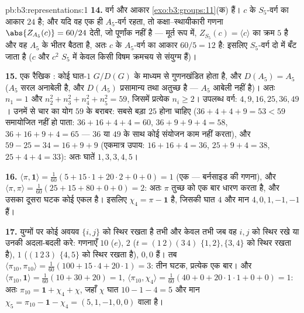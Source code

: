 \begin{solution}{pb:b3:representations:1}
\textbf{14.} वर्ग और आकार \cref{exo:b3:groups:11}(क) हैं। $c$ के $S_5$-वर्ग का आकार
$24$ है; और यदि वह एक ही $A_5$-वर्ग रहता, तो कक्षा--स्थायीकारी गणना
$\abs{Z_{A_5}(c)} = 60/24$ देती, जो पूर्णांक नहीं है --- मूर्त रूप में, $Z_{S_5}(c) = \langle c\rangle$ का क्रम
$5$ है और वह $A_5$ के भीतर बैठता है, अतः $c$ के $A_5$-वर्ग का
आकार $60/5 =
12$ है: इसलिए $S_5$-वर्ग दो में बँट जाता है ($c$ और $c^2$
$S_5$ में केवल किसी विषम क्रमचय से संयुग्म हैं)।

\textbf{15.} एक रैखिक : कोई घात-$1$  $G/D(G)$ के माध्यम
से गुणनखंडित होता है, और $D(A_5) = A_5$ ($A_5$ सरल अनाबेली है, और $D(A_5)$
प्रसामान्य तथा अतुच्छ है --- $A_5$ आबेली नहीं है)। अतः $n_1 = 1$ और
$n_2^2 + n_3^2 + n_4^2
+ n_5^2 = 59$, जिसमें प्रत्येक $n_i \geq 2$। उपलब्ध वर्ग: $4, 9,
16, 25, 36, 49$। उनमें से चार का
योग $59$ के बराबर: सबसे बड़ा $25$ होना चाहिए ($36 + 4 + 4 + 9 = 53 < 59$ समायोजित नहीं
हो पाता: $36 + 16 + 4 + 4 = 60$, $36 + 9 + 9 + 4 = 58$, $36 +
16 + 9 + 4 = 65$ --- $36$ या $49$ के साथ कोई संयोजन
काम नहीं करता), और $59 - 25 = 34 = 16 + 9 + 9$ (एकमात्र उपाय: $16 + 16 + 4 =
36$, $25 + 9 + 4 = 38$, $25 + 4 + 4 = 33$): अतः
घातें $1, 3, 3,
4, 5$।

\textbf{16.} $\langle\pi, \mathbf 1\rangle = \frac1{60}(5 +
15\cdot1 + 20\cdot2 + 0 + 0) = 1$ (एक  --- बर्नसाइड की गणना), और $\langle\pi, \pi\rangle = \frac1{60}(25 + 15 + 80 +
0 + 0) = 2$: अतः
$\pi$ तुच्छ  को एक बार धारण करता है, और उसका दूसरा घटक कोई एकल
 है। इसलिए $\chi_4 = \pi
- \mathbf 1$  है, जिसकी घात $4$ और मान $4, 0,
1, -1, -1$
हैं।

\textbf{17.} युग्मों पर कोई अवयव $\{i,j\}$ को स्थिर रखता है तभी और केवल
तभी जब वह $i, j$ को स्थिर रखे या उनकी अदला-बदली करे: गणनाएँ $10$
($e$), $2$ ($t =
(1\,2)(3\,4)$ $\{1,2\}, \{3,4\}$ को स्थिर रखता है), $1$ ($(1\,2\,3)$ $\{4,5\}$
को स्थिर रखता है), $0, 0$ हैं। तब $\langle\pi_{10},
\pi_{10}\rangle = \frac1{60}(100 + 15\cdot4 + 20\cdot1) = 3$: तीन  घटक, प्रत्येक
एक बार। और $\langle\pi_{10}, \mathbf 1\rangle = \frac1{60}(10 + 30 + 20)
= 1$, $\langle\pi_{10}, \chi_4\rangle = \frac1{60}(40 + 0 +
20\cdot1\cdot1 + 0 + 0) = 1$: अतः $\pi_{10} = \mathbf 1 + \chi_4
+ \chi$, जहाँ $\chi$ घात
$10 - 1 - 4 = 5$ और मान $\chi_5 = \pi_{10} - \mathbf 1 - \chi_4 = (5, 1, -1, 0,
0)$ वाला  है।


\end{solution}
